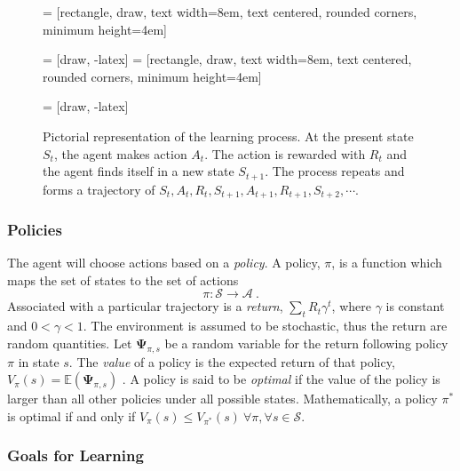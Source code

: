 \begin{figure}[h!]
\centering
	
 = [rectangle, draw, 
text width=8em, text centered, rounded corners, minimum height=4em]

 = [draw, -latex]
 = [rectangle, draw, 
text width=8em, text centered, rounded corners, minimum height=4em]

 = [draw, -latex]


\caption{Pictorial representation of the learning process.  At the present state $ S_t $, the agent makes action $ A_t $.  The action is rewarded with $ R_t $ and the agent finds itself in a new state $ S_{t+1} $.  The process repeats and forms a trajectory of $ {S_t,A_t,R_t,S_{t+1}, A_{t+1}, R_{t+1}, S_{t+2}, \cdots} $.  }
\label{RL_diagram}
\end{figure}


\subsubsection{Policies}

The agent will choose actions based on a \textit{policy}.  A policy, $ \pi $, is a function which maps the set of states to the set of actions  
%
\begin{equation}\label{key}
\pi : \mathcal{S} \rightarrow \mathcal{A}\>.
\end{equation}
%
Associated with a particular trajectory is a \textit{return}, $ \sum_t R_t \gamma^t $, where $ \gamma $ is constant and $ 0 < \gamma < 1 $.  The environment is assumed to be stochastic, thus the return are random quantities. Let $ \mathbf{\Psi}_{\pi,s} $ be a random variable for the return following policy $ \pi $ in state $ s $.  The \textit{value} of a policy is the expected return of that policy, $V_{\pi}(s) =  \mathbb{E}(\mathbf{\Psi}_{\pi,s}) $ \cite{lizotte2017reinforcement}.  A policy is said to be \textit{optimal} if the value of the policy is larger than all other policies under all possible states.  Mathematically, a policy $ \pi^* $ is optimal if and only if $ V_{\pi}(s)  \leq V_{\pi^*}(s) \> \forall \pi, \forall s\in \mathcal{S}  $.

\subsubsection{Goals for Learning}